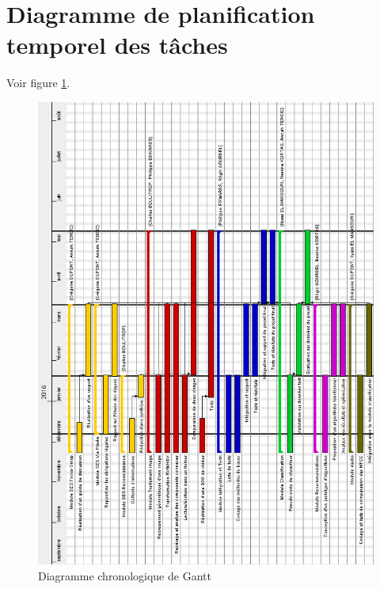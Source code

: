 \section{Diagramme de planification temporel des tâches}
	Voir figure \ref{gantt}.
	
	\begin{figure}[htp]
		\includegraphics[scale=0.60]{images/gantt2.png}
		\caption{Diagramme chronologique de Gantt}
		\label{gantt}
	\end{figure}
		


